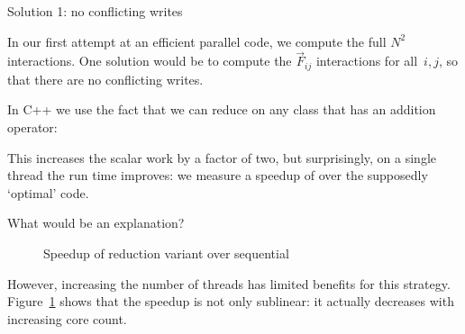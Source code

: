  {Solution 1: no conflicting writes}

In our first attempt at an efficient parallel code,
we compute the full $N^2$ interactions.
One solution would be to compute the $\overrightarrow F_{ij}$
interactions for all~$i,j$,
so that there are no conflicting writes.


In C++ we use the fact that we can reduce on any class
that has an addition operator:
%

This increases the scalar work by a factor of two,
but surprisingly, on a single thread the run time improves:
we measure a speedup of  over the supposedly `optimal' code.

\begin{exercise}
  What would be an explanation?
\end{exercise}


\begin{figure}[t]
  \caption{{Speedup of reduction variant over sequential}}
  \label{fig:omp-nbody1}
\end{figure}

However, increasing the number of threads has limited benefits for this strategy.
Figure~\ref{fig:omp-nbody1} shows that
the speedup is not only sublinear:
it actually decreases with increasing core count.

\begin{comment}
\begin{verbatim}
================ #threads = 1 ================
               Sequential: 2.029093e+01; 
       Full loop Parallel: 3.118345e+00; speedup= 6.51
================ #threads = 18 ================
       Full loop Parallel: 1.940827e+00; speedup=10.46
================ #threads = 37 ================
       Full loop Parallel: 4.390490e+00; speedup= 4.63
================ #threads = 56 ================
       Full loop Parallel: 8.484191e+00; speedup= 2.40
\end{verbatim}
\end{comment}

